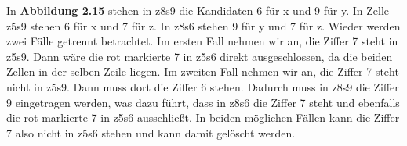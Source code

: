\noindent In \textbf{Abbildung 2.15} stehen in z8s9 die Kandidaten 6 für x und 9 für y. In Zelle z5s9 stehen 6 für x und 7 für z. In z8s6 stehen 9 für y und 7 für z. Wieder werden zwei Fälle getrennt betrachtet. Im ersten Fall nehmen wir an, die Ziffer 7 steht in z5s9. Dann wäre die rot markierte 7 in z5s6 direkt ausgeschlossen, da die beiden Zellen in der selben Zeile liegen. Im zweiten Fall nehmen wir an, die Ziffer 7 steht nicht in z5s9. Dann muss dort die Ziffer 6 stehen. Dadurch muss in z8s9 die Ziffer 9 eingetragen werden, was dazu führt, dass in z8s6 die Ziffer 7 steht und ebenfalls die rot markierte 7 in z5s6 ausschließt. In beiden möglichen Fällen kann die Ziffer 7 also nicht in z5s6 stehen und kann damit gelöscht werden.